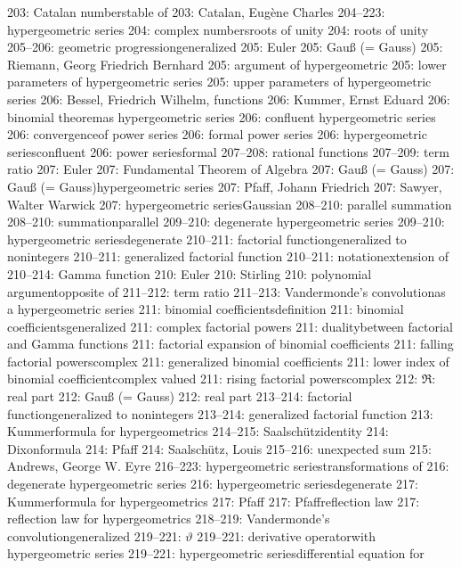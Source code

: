 203: Catalan numbers\sub table of
203: Catalan, Eug\`ene Charles
204--223: hypergeometric series
204: complex numbers\sub roots of unity
204: roots of unity
205--206: geometric progression\sub generalized
205: Euler
205: Gau{\ss} (= Gauss)
205: Riemann, Georg Friedrich Bernhard
205: argument of hypergeometric
205: lower parameters of hypergeometric series
205: upper parameters of hypergeometric series
206: Bessel, Friedrich Wilhelm, functions
206: Kummer, Ernst Eduard
206: binomial theorem\sub as hypergeometric series
206: confluent hypergeometric series
206: convergence\sub of power series
206: formal power series
206: hypergeometric series\sub confluent
206: power series\sub formal
207--208: rational functions
207--209: term ratio
207: Euler
207: Fundamental Theorem of Algebra
207: Gau{\ss} (= Gauss)
207: Gau{\ss} (= Gauss)\sub hypergeometric series
207: Pfaff, Johann Friedrich
207: Sawyer, Walter Warwick
207: hypergeometric series\sub Gaussian
208--210: parallel summation
208--210: summation\sub parallel
209--210: degenerate hypergeometric series
209--210: hypergeometric series\sub degenerate
210--211: factorial function\sub generalized to nonintegers
210--211: generalized factorial function
210--211: notation\sub extension of
210--214: Gamma function
210: Euler
210: Stirling
210: polynomial argument\sub opposite of
211--212: term ratio
211--213: Vandermonde's convolution\sub as a hypergeometric series
211: binomial coefficients\sub definition
211: binomial coefficients\sub generalized
211: complex factorial powers
211: duality\sub between factorial and Gamma functions
211: factorial expansion of binomial coefficients
211: falling factorial powers\sub complex
211: generalized binomial coefficients
211: lower index of binomial coefficient\sub complex valued
211: rising factorial powers\sub complex
212: $\Re$: real part
212: Gau{\ss} (= Gauss)
212: real part
213--214: factorial function\sub generalized to nonintegers
213--214: generalized factorial function
213: Kummer\sub formula for hypergeometrics
214--215: Saalsch\"utz\sub identity
214: Dixon\sub formula
214: Pfaff
214: Saalsch\"utz, Louis
215--216: unexpected sum
215: Andrews, George W. Eyre
216--223: hypergeometric series\sub transformations of
216: degenerate hypergeometric series
216: hypergeometric series\sub degenerate
217: Kummer\sub formula for hypergeometrics
217: Pfaff
217: Pfaff\sub reflection law
217: reflection law for hypergeometrics
218--219: Vandermonde's convolution\sub generalized
219--221: $\vartheta$
219--221: derivative operator\sub with hypergeometric series
219--221: hypergeometric series\sub differential equation for
